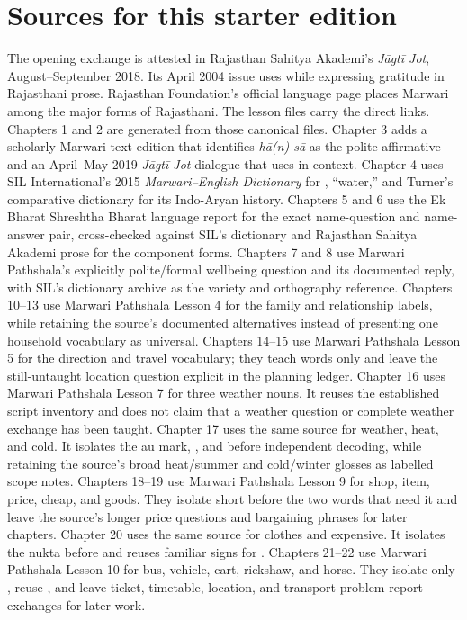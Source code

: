 
\backmatter




\chapter*{Sources for this starter edition}

The opening exchange is attested in Rajasthan Sahitya Akademi's \emph{Jāgtī
Jot}, August--September 2018. Its April 2004 issue uses  while
expressing gratitude in Rajasthani prose. Rajasthan Foundation's official
language page places Marwari among the major forms of Rajasthani. The lesson
files carry the direct links. Chapters 1 and 2 are generated from those
canonical files. Chapter 3 adds a scholarly Marwari text edition that identifies
\emph{hā(n)-sā} as the polite affirmative and an April--May 2019 \emph{Jāgtī Jot}
dialogue that uses  in context. Chapter 4 uses SIL International's
2015 \emph{Marwari--English Dictionary} for , ``water,'' and Turner's
comparative dictionary for its Indo-Aryan history.
Chapters 5 and 6 use the Ek Bharat Shreshtha Bharat language report for the exact
name-question and name-answer pair, cross-checked against SIL's dictionary and
Rajasthan Sahitya Akademi prose for the component forms.
Chapters 7 and 8 use Marwari Pathshala's explicitly polite/formal wellbeing
question and its documented reply, with SIL's dictionary archive as the variety
and orthography reference.
Chapters 10--13 use Marwari Pathshala Lesson 4 for the family and relationship
labels, while retaining the source's documented alternatives instead of
presenting one household vocabulary as universal.
Chapters 14--15 use Marwari Pathshala Lesson 5 for the direction and travel
vocabulary; they teach words only and leave the still-untaught location question
explicit in the planning ledger.
Chapter 16 uses Marwari Pathshala Lesson 7 for three weather nouns. It reuses
the established script inventory and does not claim that a weather question or
complete weather exchange has been taught.
Chapter 17 uses the same source for weather, heat, and cold. It isolates the au
mark, , and  before independent decoding, while retaining the
source's broad heat/summer and cold/winter glosses as labelled scope notes.
Chapters 18--19 use Marwari Pathshala Lesson 9 for shop, item, price, cheap,
and goods. They isolate short  before the two words that need it and leave
the source's longer price questions and bargaining phrases for later chapters.
Chapter 20 uses the same source for clothes and expensive. It isolates the
nukta before  and reuses familiar signs for .
Chapters 21--22 use Marwari Pathshala Lesson 10 for bus, vehicle, cart,
rickshaw, and horse. They isolate only , reuse , and leave ticket,
timetable, location, and transport problem-report exchanges for later work.




